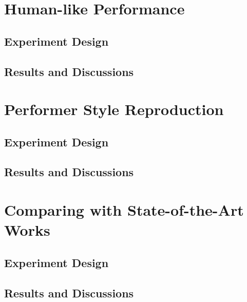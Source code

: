 \section{Human-like Performance}
\subsection{Experiment Design}

\subsection{Results and Discussions}

\section{Performer Style Reproduction}
\subsection{Experiment Design}

\subsection{Results and Discussions}
\section{Comparing with State-of-the-Art Works}
\subsection{Experiment Design}
\subsection{Results and Discussions}
